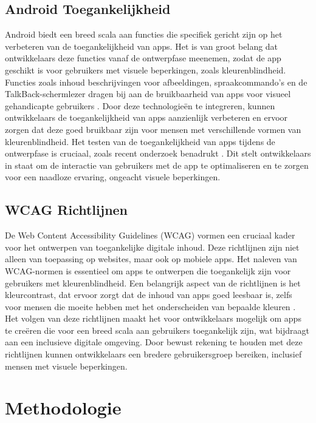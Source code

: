 \subsection{Android Toegankelijkheid}
Android biedt een breed scala aan functies die specifiek gericht zijn op het verbeteren van 
de toegankelijkheid van apps. Het is van groot belang dat ontwikkelaars deze functies vanaf de 
ontwerpfase meenemen, zodat de app geschikt is voor gebruikers met visuele beperkingen, zoals 
kleurenblindheid. Functies zoals inhoud beschrijvingen voor afbeeldingen, spraakcommando’s en de 
TalkBack-schermlezer dragen bij aan de bruikbaarheid van apps voor visueel gehandicapte 
gebruikers \autocite{Swearngin2024}. Door deze technologieën te integreren, kunnen ontwikkelaars de 
toegankelijkheid van apps aanzienlijk verbeteren en ervoor zorgen dat deze goed bruikbaar zijn voor 
mensen met verschillende vormen van kleurenblindheid. Het testen van de toegankelijkheid van apps 
tijdens de ontwerpfase is cruciaal, zoals recent onderzoek benadrukt \textcite{Gregorio2022}. Dit stelt 
ontwikkelaars in staat om de interactie van gebruikers met de app te optimaliseren en te zorgen voor 
een naadloze ervaring, ongeacht visuele beperkingen.
\subsection{WCAG Richtlijnen}
De Web Content Accessibility Guidelines (WCAG) vormen een cruciaal kader voor het ontwerpen 
van toegankelijke digitale inhoud. Deze richtlijnen zijn niet alleen van toepassing op websites, 
maar ook op mobiele apps. Het naleven van WCAG-normen is essentieel om apps te ontwerpen die 
toegankelijk zijn voor gebruikers met kleurenblindheid. Een belangrijk aspect van de richtlijnen is 
het kleurcontrast, dat ervoor zorgt dat de inhoud van apps goed leesbaar is, zelfs voor mensen die 
moeite hebben met het onderscheiden van bepaalde kleuren \autocite{Lindahl2023}. Het volgen van deze 
richtlijnen maakt het voor ontwikkelaars mogelijk om apps te creëren die voor een breed scala aan 
gebruikers toegankelijk zijn, wat bijdraagt aan een inclusieve digitale omgeving. Door bewust 
rekening te houden met deze richtlijnen kunnen ontwikkelaars een bredere gebruikersgroep bereiken, 
inclusief mensen met visuele beperkingen.



\section{Methodologie}%
\label{sec:methodologie}
